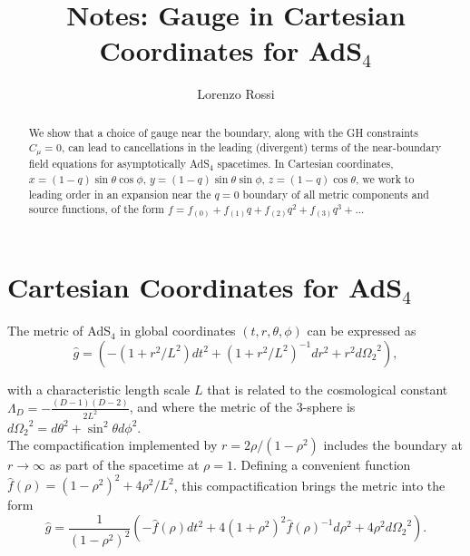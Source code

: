 \documentclass[12pt]{article}
\begin{document}
\title{Notes: Gauge in Cartesian Coordinates for AdS$_4$}

\author{Lorenzo Rossi}

\maketitle

\begin{abstract}
We show that a choice of gauge near the boundary, along with the GH constraints $C_\mu = 0$, can lead to 
cancellations in the leading (divergent) terms of the near-boundary field equations for asymptotically AdS$_4$ spacetimes. 
In Cartesian coordinates, $x=(1-q)\sin\theta\cos\phi$, $y=(1-q)\sin\theta\sin\phi$, $z=(1-q)\cos\theta$, we work to leading order in an expansion near the $q=0$ boundary of all 
metric components and source functions, of the form $f=f_{(0)} + f_{(1)} q + f_{(2)} q^2 + f_{(3)} q^3 + ...$
\end{abstract}





\section{Cartesian Coordinates for AdS$_4$}
The metric of AdS$_4$ in global coordinates $(t,r,\theta,\phi)$ can be expressed as
\begin{equation}
\hat{g} = \left( -(1+r^2/L^2) dt^2 + (1+r^2/L^2)^{-1} dr^2 +r^2 d{\Omega_2}^2 \right), \nonumber
\end{equation}

\noindent with a characteristic length scale $L$ that is related to the cosmological constant $\Lambda_D = - \frac{(D-1)(D-2)}{2 L^2}$, and where the metric of the 3-sphere is $d{\Omega_2}^2 = d\theta^2 + \sin^2\theta d\phi^2$. \\

\noindent The compactification implemented by $r=2\rho/(1-\rho^2)$ includes the boundary at $r \rightarrow \infty$ as part of the spacetime at $\rho=1$. Defining a convenient function $\hat{f}(\rho) = (1-\rho^2)^2+4\rho^2/L^2$, this compactification brings the metric into the form
\begin{equation}
\hat{g} = \frac{1}{(1-\rho^2)^2} \left( -\hat{f}(\rho) dt^2 + 4(1+\rho^2)^2 \hat{f}(\rho)^{-1} d\rho^2 + 4\rho^2 d{\Omega_2}^2 \right). \nonumber
\end{equation}
\end{document}
